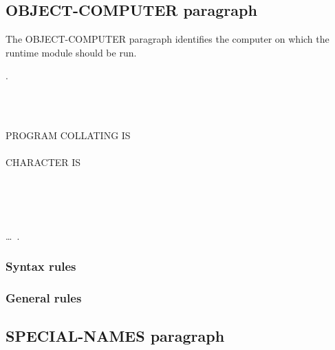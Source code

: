 \subsection{OBJECT-COMPUTER paragraph}

The OBJECT-COMPUTER paragraph identifies the computer on which the runtime module should be run.

\begin{syntax}
  .

  \begin{0-1}
    \begin{0-1}
      \begin{1=}
        \computername
      \end{1=}\gnucobol{\ldots}
    \end{0-1}\\\quad
    \begin{0-1}
       \\
      PROGRAM COLLATING  IS  \\
       \\
      CHARACTER  IS
      \begin{1=}
         \\
         \\
         \\
      \end{1=}
    \end{0-1}\ldots\ {}.
  \end{0-1}
\end{syntax}

\subsubsection{Syntax rules}

\subsubsection{General rules}

\subsection{SPECIAL-NAMES paragraph}

